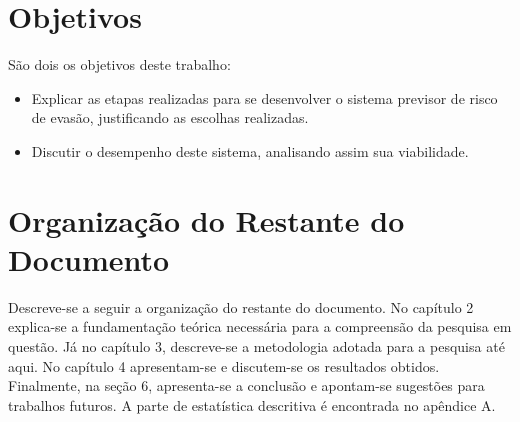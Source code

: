 \section{Objetivos}
São dois os objetivos deste trabalho: 
\begin{itemize}
    \item Explicar as etapas realizadas para se desenvolver o sistema previsor de
        risco de evasão, justificando as escolhas realizadas.
    \item Discutir o desempenho deste sistema, analisando assim sua viabilidade.
\end{itemize}

\section{Organização do Restante do Documento}
\par Descreve-se a seguir a organização do restante do documento. 
No capítulo 2 explica-se a fundamentação teórica necessária para a compreensão da
pesquisa em questão. Já no capítulo 3, descreve-se a metodologia
adotada para a pesquisa até aqui. No capítulo 4 apresentam-se e discutem-se os resultados
obtidos. Finalmente, na seção 6, apresenta-se a conclusão e apontam-se sugestões para
trabalhos futuros. A parte de estatística descritiva é encontrada no apêndice A. 
